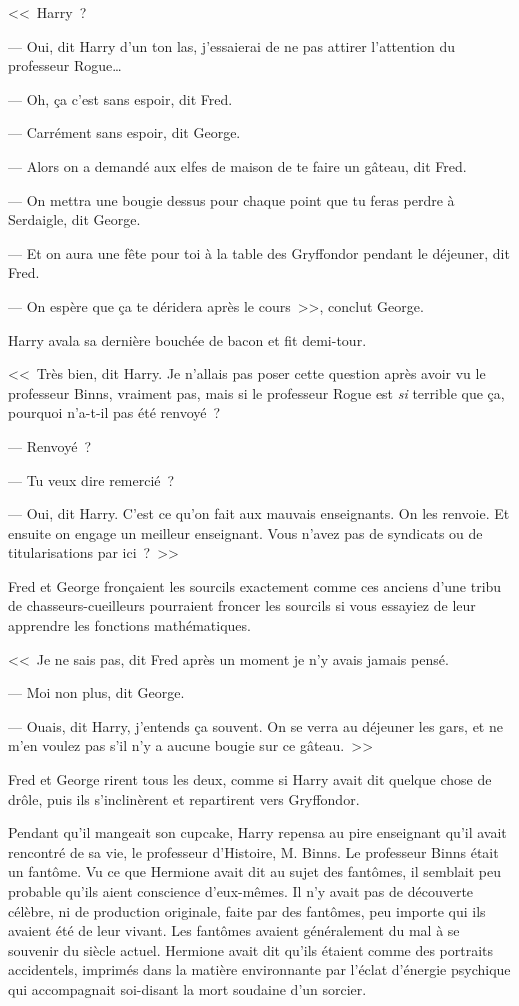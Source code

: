 <<~Harry~?

--- Oui, dit Harry d'un ton las, j'essaierai de ne pas attirer l'attention du professeur Rogue…

--- Oh, ça c'est sans espoir, dit Fred.

--- Carrément sans espoir, dit George.

--- Alors on a demandé aux elfes de maison de te faire un gâteau, dit Fred.

--- On mettra une bougie dessus pour chaque point que tu feras perdre à Serdaigle, dit George.

--- Et on aura une fête pour toi à la table des Gryffondor pendant le déjeuner, dit Fred.

--- On espère que ça te déridera après le cours~>>, conclut George.

Harry avala sa dernière bouchée de bacon et fit demi-tour.

<<~Très bien, dit Harry. Je n'allais pas poser cette question après avoir vu le professeur Binns, vraiment pas, mais si le professeur Rogue est \emph{si} terrible que ça, pourquoi n'a-t-il pas été renvoyé~?

--- Renvoyé~?

--- Tu veux dire remercié~?

--- Oui, dit Harry. C'est ce qu'on fait aux mauvais enseignants. On les renvoie. Et ensuite on engage un meilleur enseignant. Vous n'avez pas de syndicats ou de titularisations par ici~?~>>

Fred et George fronçaient les sourcils exactement comme ces anciens d'une tribu de chasseurs-cueilleurs pourraient froncer les sourcils si vous essayiez de leur apprendre les fonctions mathématiques.

<<~Je ne sais pas, dit Fred après un moment je n'y avais jamais pensé.

--- Moi non plus, dit George.

--- Ouais, dit Harry, j'entends ça souvent. On se verra au déjeuner les gars, et ne m'en voulez pas s'il n'y a aucune bougie sur ce gâteau.~>>

Fred et George rirent tous les deux, comme si Harry avait dit quelque chose de drôle, puis ils s'inclinèrent et repartirent vers Gryffondor.

Pendant qu'il mangeait son cupcake, Harry repensa au pire enseignant qu'il avait rencontré de sa vie, le professeur d'Histoire, M. Binns. Le professeur Binns était un fantôme. Vu ce que Hermione avait dit au sujet des fantômes, il semblait peu probable qu'ils aient conscience d'eux-mêmes. Il n'y avait pas de découverte célèbre, ni de production originale, faite par des fantômes, peu importe qui ils avaient été de leur vivant. Les fantômes avaient généralement du mal à se souvenir du siècle actuel. Hermione avait dit qu'ils étaient comme des portraits accidentels, imprimés dans la matière environnante par l'éclat d'énergie psychique qui accompagnait soi-disant la mort soudaine d'un sorcier.


